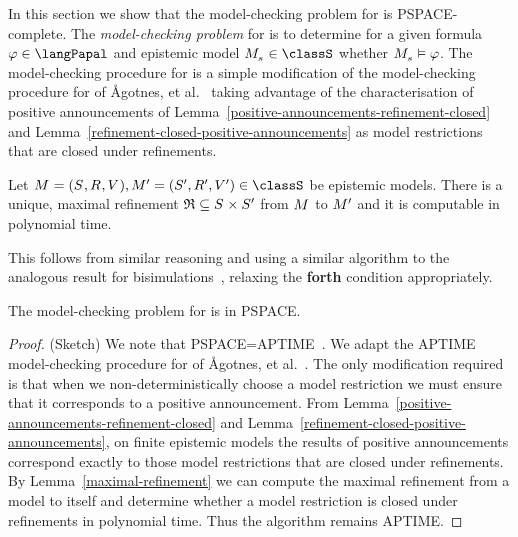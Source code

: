 In this section we show that the model-checking problem for \logicPapalS{} is PSPACE-complete.
The {\em model-checking problem} for \logicPapalS{} is to determine for a given formula $\phi \in \langPapal$ and epistemic model $\kPModel{\kStateS} \in \classS$ whether $\kPModel{\kStateS} \entails \phi$.
The model-checking procedure for \logicPapalS{} is a simple modification of the model-checking procedure for \logicApalS{} of Ågotnes, et al.~\cite{agotnes:2010} taking advantage of the characterisation of positive announcements of Lemma~\ref{positive-announcements-refinement-closed} and Lemma~\ref{refinement-closed-positive-announcements} as model restrictions that are closed under refinements.

\begin{lemma}\label{maximal-refinement}
    Let $\kModelAndTuple, \kModelAndTuple[\prime] \in \classS$ be epistemic models.
    There is a unique, maximal refinement $\refinement \subseteq \kStates \times \kStates[\prime]$ from $\kModel$ to $\kModel[\prime]$ and it is computable in polynomial time.
\end{lemma}

This follows from similar reasoning and using a similar algorithm to the analogous result for bisimulations~\cite{goranko:2006}, relaxing the {\bf forth} condition appropriately.

\begin{theorem}\label{papal-model-checking-pspace}
    The model-checking problem for \logicPapalS{} is in PSPACE.
\end{theorem}

\begin{proof}{(Sketch)}
    We note that PSPACE=APTIME~\cite{chandra:1981}.
    We adapt the APTIME model-checking procedure for \logicApalS{} of Ågotnes, et al.~\cite{agotnes:2010}.
    The only modification required is that when we non-deterministically choose a model restriction we must ensure that it corresponds to a positive announcement.
    From Lemma~\ref{positive-announcements-refinement-closed} and Lemma~\ref{refinement-closed-positive-announcements}, on finite epistemic models the results of positive announcements correspond exactly to those model restrictions that are closed under refinements.
    By Lemma~\ref{maximal-refinement} we can compute the maximal refinement from a model to itself and determine whether a model restriction is closed under refinements in polynomial time.
    Thus the algorithm remains APTIME.
\end{proof}


